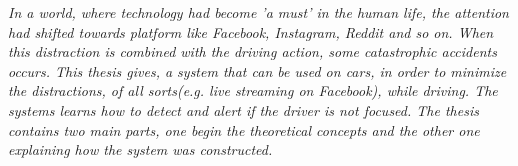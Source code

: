\textit{ In a world, where technology had become 'a must' in the human life, the attention had shifted towards platform like Facebook, Instagram, Reddit and so on. When this distraction is combined with the driving action, some catastrophic accidents occurs. This thesis gives, a system that can be used on cars, in order to minimize the distractions, of all sorts(e.g. live streaming on Facebook), while driving. The systems learns how to detect and alert if the driver is not focused. The thesis contains two main parts, one begin the theoretical concepts and the other one explaining how the system was constructed.}